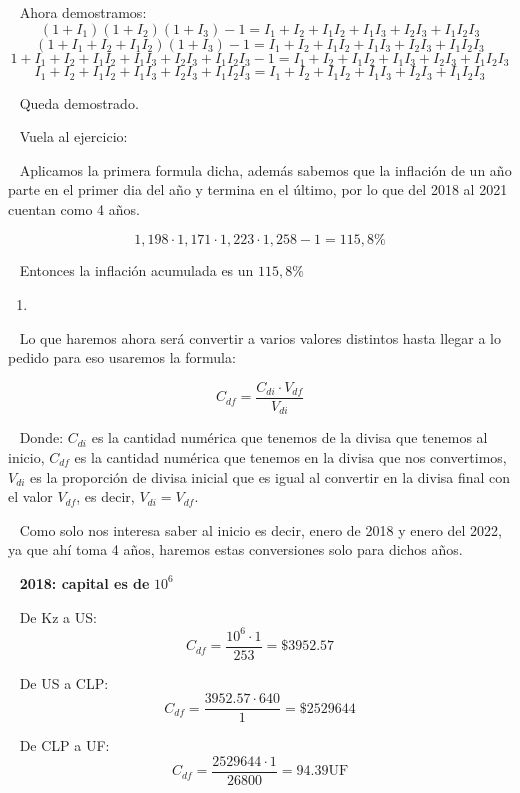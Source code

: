 \documentclass[
  letterpaper,
  DIV=11,
  numbers=noendperiod]{scrreport}
\providecommand{\tightlist}{%
  \setlength{\itemsep}{0pt}\setlength{\parskip}{0pt}}\usepackage{longtable,booktabs,array}
\begin{document}
~ Ahora demostramos: \[
(1+I_1)(1+I_2)(1+I_3)-1=I_1+I_2+I_1I_2+I_1I_3+I_2I_3+I_1I_2I_3
\] \[
(1+I_1+I_2+I_1I_2)(1+I_3)-1=I_1+I_2+I_1I_2+I_1I_3+I_2I_3+I_1I_2I_3
\] \[
1+I_1+I_2+I_1I_2+I_1I_3+I_2I_3+I_1I_2I_3-1=I_1+I_2+I_1I_2+I_1I_3+I_2I_3+I_1I_2I_3
\] \[
I_1+I_2+I_1I_2+I_1I_3+I_2I_3+I_1I_2I_3=I_1+I_2+I_1I_2+I_1I_3+I_2I_3+I_1I_2I_3
\]

~ Queda demostrado.

\hfill\break

~ Vuela al ejercicio:

\hfill\break

~ Aplicamos la primera formula dicha, además sabemos que la inflación de
un año parte en el primer dia del año y termina en el último, por lo que
del 2018 al 2021 cuentan como 4 años.

\[
1,198\cdot 1,171 \cdot 1,223 \cdot 1,258 - 1 = 115,8\% 
\]

~ Entonces la inflación acumulada es un \(115,8\%\)

\hfill\break

\begin{enumerate}
\def\labelenumi{\arabic{enumi})}
\setcounter{enumi}{2}
\tightlist
\item
\end{enumerate}

\hfill\break

~ Lo que haremos ahora será convertir a varios valores distintos hasta
llegar a lo pedido para eso usaremos la formula:

\[
C_{df}=\frac{C_{di}\cdot V_{df}}{V_{di}}
\]

~ Donde: \(C_{di}\) es la cantidad numérica que tenemos de la divisa que
tenemos al inicio, \(C_{df}\) es la cantidad numérica que tenemos en la
divisa que nos convertimos, \(V_{di}\) es la proporción de divisa
inicial que es igual al convertir en la divisa final con el valor
\(V_{df}\), es decir, \(V_{di}=V_{df}\).

~ Como solo nos interesa saber al inicio es decir, enero de 2018 y enero
del 2022, ya que ahí toma 4 años, haremos estas conversiones solo para
dichos años.

~ \textbf{2018: capital es de} \(10^6\)

~ De Kz a US: \[
C_{df}=\frac{10^6\cdot 1}{253}=\$3952.57
\]

~ De US a CLP: \[
C_{df}=\frac{3952.57\cdot 640}{1}=\$2529644
\]

~ De CLP a UF: \[
C_{df}=\frac{2529644\cdot 1}{26800}=94.39\text{UF}
\]
\end{document}
